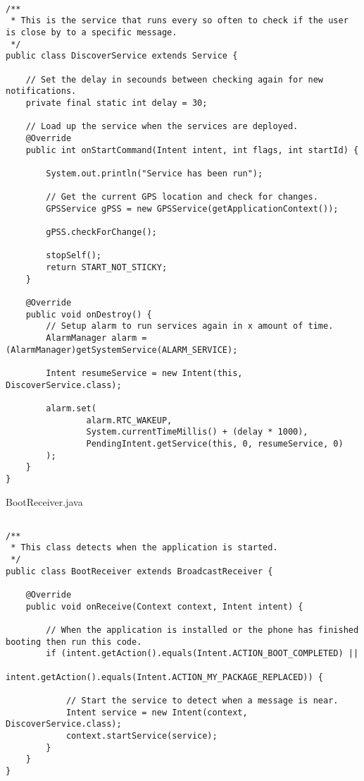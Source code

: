 \begin{lstlisting}

/**
 * This is the service that runs every so often to check if the user is close by to a specific message.
 */
public class DiscoverService extends Service {

    // Set the delay in secounds between checking again for new notifications.
    private final static int delay = 30;

    // Load up the service when the services are deployed.
    @Override
    public int onStartCommand(Intent intent, int flags, int startId) {

        System.out.println("Service has been run");

        // Get the current GPS location and check for changes.
        GPSService gPSS = new GPSService(getApplicationContext());

        gPSS.checkForChange();

        stopSelf();
        return START_NOT_STICKY;
    }

    @Override
    public void onDestroy() {
        // Setup alarm to run services again in x amount of time.
        AlarmManager alarm = (AlarmManager)getSystemService(ALARM_SERVICE);

        Intent resumeService = new Intent(this, DiscoverService.class);

        alarm.set(
                alarm.RTC_WAKEUP,
                System.currentTimeMillis() + (delay * 1000),
                PendingIntent.getService(this, 0, resumeService, 0)
        );
    }
}

\end{lstlisting}

BootReceiver.java

\begin{lstlisting}

/**
 * This class detects when the application is started.
 */
public class BootReceiver extends BroadcastReceiver {

    @Override
    public void onReceive(Context context, Intent intent) {

        // When the application is installed or the phone has finished booting then run this code.
        if (intent.getAction().equals(Intent.ACTION_BOOT_COMPLETED) ||
                intent.getAction().equals(Intent.ACTION_MY_PACKAGE_REPLACED)) {

            // Start the service to detect when a message is near.
            Intent service = new Intent(context, DiscoverService.class);
            context.startService(service);
        }
    }
}

\end{lstlisting}

